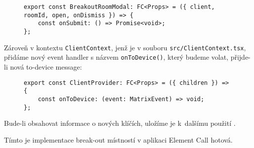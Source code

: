 \begin{figure}[H]
    \begin{verbatim}
export const BreakoutRoomModal: FC<Props> = ({ client, roomId, open, onDismiss }) => {
	const onSubmit: () => Promise<void>;
};
	\end{verbatim}
\end{figure}

Zároveň v kontextu \texttt{ClientContext}, jenž je v souboru
\texttt{src/ClientContext.tsx}, přidáme nový event handler s názvem
\texttt{onToDevice()}, který budeme volat, přijde-li nová
to-device message:

\begin{figure}[H]
    \begin{verbatim}
export const ClientProvider: FC<Props> = ({ children }) => {
	const onToDevice: (event: MatrixEvent) => void;
};
	\end{verbatim}
\end{figure}

Bude-li obsahovat informace o nových klíčích, uložíme je
k~dalšímu použití \parencite{GitHub-ElementCall-BreakoutRooms}.

Tímto je implementace break-out místností v aplikaci Element Call hotová.
